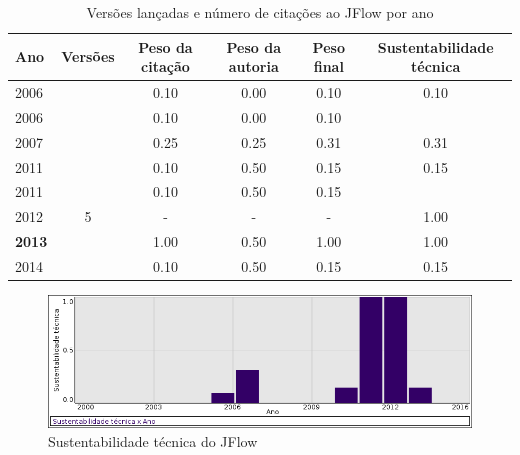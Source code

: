 \begin{table}[H]
\caption{Versões lançadas e número de citações ao JFlow por ano}
\centering
\begin{tabular}{| l | c | c | c | c | c |}
  \hline
  Ano & Versões & Peso da citação & Peso da autoria & Peso final & Sustentabilidade técnica \\
  \hline
            2006
          &
          
          &
          0.10
          &
          0.00
          &
          0.10
          &
            {\color{red} 0.10}
          \\
            2006
          &
          
          &
          0.10
          &
          0.00
          &
          0.10
          &
          \\
\hline
            2007
          &
          
          &
          0.25
          &
          0.25
          &
          0.31
          &
            {\color{red} 0.31}
          \\
\hline
            2011
          &
          
          &
          0.10
          &
          0.50
          &
          0.15
          &
            {\color{red} 0.15}
          \\
            2011
          &
          
          &
          0.10
          &
          0.50
          &
          0.15
          &
          \\
\hline
        2012 & 5 & - & - & -
        &
          {\color{blue} 1.00}
        \\
\hline
            {\bf 2013}
          &
          
          &
          1.00
          &
          0.50
          &
          1.00
          &
            {\color{blue} 1.00}
          \\
\hline
            2014
          &
          
          &
          0.10
          &
          0.50
          &
          0.15
          &
            {\color{red} 0.15}
          \\
\hline
\end{tabular}
\end{table}

\begin{figure}[h]
  \center
  \includegraphics[scale=0.50]{imagens/softwares-charts/jflow.png}
  \caption{Sustentabilidade técnica do JFlow}
\end{figure}


